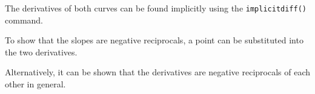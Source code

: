 The derivatives of both curves can be found implicitly using the \texttt{implicitdiff()} command.

\begin{maplegroup}
\begin{mapleinput}
\end{mapleinput}
\mapleresult
\begin{maplelatex}
\end{maplelatex}
\end{maplegroup}

\begin{maplegroup}
\begin{mapleinput}
\end{mapleinput}
\mapleresult
\begin{maplelatex}
\end{maplelatex}
\end{maplegroup}

To show that the slopes are negative reciprocals, a point can be substituted into the two derivatives.

\begin{maplegroup}
\begin{mapleinput}
\end{mapleinput}
\mapleresult
\begin{maplelatex}
\end{maplelatex}
\begin{mapleinput}
\end{mapleinput}
\mapleresult
\begin{maplelatex}
\end{maplelatex}
\end{maplegroup}

Alternatively, it can be shown that the derivatives are negative reciprocals of each other in general.


\begin{maplegroup}
\begin{mapleinput}
\end{mapleinput}
\mapleresult
\begin{maplelatex}
\end{maplelatex}
\end{maplegroup}